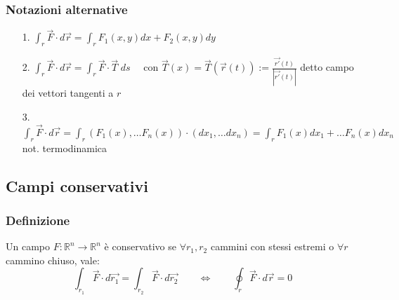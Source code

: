 \documentclass[a4paper]{article}
\newcommand\Rn{\mathbb{R}^n}  %
\begin{document}
\subsubsection*{Notazioni alternative}
\begin{itemize}
	\item[1.] \(\displaystyle \int_r \vec{F} \cdot d\vec{r} = \int_r F_1(x,y) dx + F_2(x,y) dy\)
	\item[2.] \(\displaystyle \int_r \vec{F} \cdot d\vec{r} = \int_r \vec{F} \cdot \vec{T} \; ds \quad\) con \(\displaystyle \vec{T}(x) = \vec{T}(\vec{r}(t)) := \frac{\vec{r'}(t)}{\left|\vec{r'}(t)\right|}\) detto campo dei vettori tangenti a \(r\)
	\item[3.] \(\displaystyle \int_r \vec{F} \cdot d\vec{r} = \int_r (F_1(x), \dots F_n(x)) \cdot (dx_1, \dots dx_n) = \int_r F_1(x)dx_1 + \dots F_n(x) dx_n \quad\) not. termodinamica
\end{itemize}

\subsection{Campi conservativi}
\subsubsection*{Definizione}
Un campo \(F: \Rn \to \Rn\) è conservativo se \(\forall r_1, r_2\) cammini con stessi estremi o \(\forall r\) cammino chiuso, vale:
\[\int_{r_1} \vec{F} \cdot d\vec{r_1} = \int_{r_2} \vec{F} \cdot d\vec{r_2} \qquad \Leftrightarrow \qquad \oint_r \vec{F} \cdot d\vec{r} = 0\]
\end{document}
